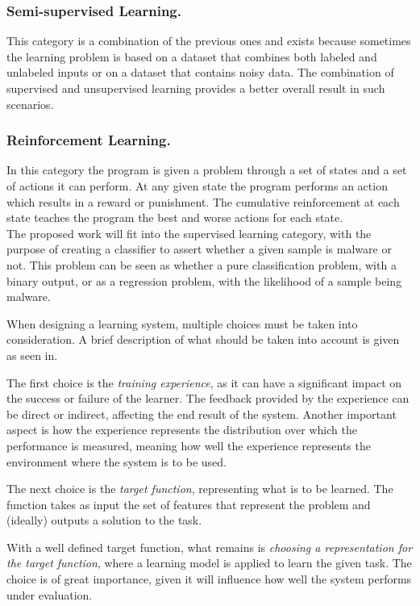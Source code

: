 \subsubsection{Semi-supervised Learning.} This category is a combination of the previous ones and exists because sometimes the learning problem is based on a dataset that combines both labeled and unlabeled inputs or on a dataset that contains noisy data. The combination of supervised and unsupervised learning provides a better overall result in such scenarios.

\subsubsection{Reinforcement Learning.} In this category the program is given a problem through a set of states and a set of actions it can perform. At any given state the program performs an action which results in a reward or punishment. The cumulative reinforcement at each state teaches the program the best and worse actions for each state.\\

The proposed work will fit into the supervised learning category, with the purpose of creating a classifier to assert whether a given sample is malware or not. This problem can be seen as whether a pure classification problem, with a binary output, or as a regression problem, with the likelihood of a sample being malware.

When designing a learning system, multiple choices must be taken into consideration. A brief description of what should be taken into account is given as seen in\cite{mitchell:ml}.

The first choice is the \textit{training experience}, as it can have a significant impact on the success or failure of the learner. The feedback provided by the experience can be direct or indirect, affecting the end result of the system. Another important aspect is how the experience represents the distribution over which the performance is measured, meaning how well the experience represents the environment where the system is to be used.

The next choice is the \textit{target function}, representing what is to be learned. The function takes as input the set of features that represent the problem and (ideally) outputs a solution to the task.

With a well defined target function, what remains is \textit{choosing a representation for the target function}, where a learning model is applied to learn the given task. The choice is of great importance, given it will influence how well the system performs under evaluation.

